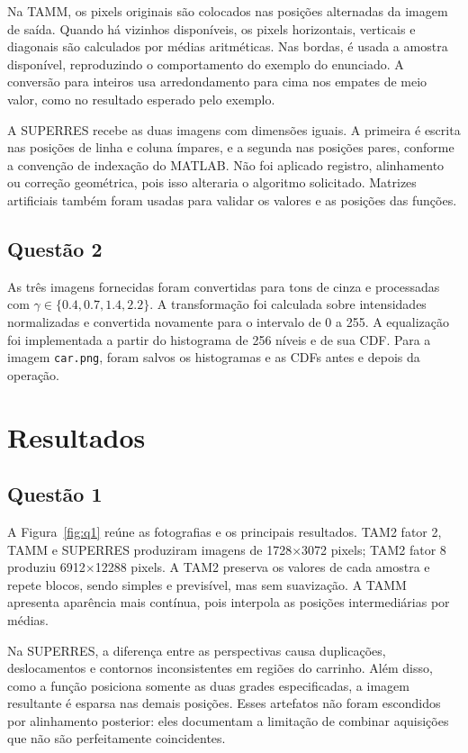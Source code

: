 \documentclass[conference]{IEEEtran}
\begin{document}
Na TAMM, os pixels originais são colocados nas posições alternadas da imagem de saída. Quando há vizinhos disponíveis, os pixels horizontais, verticais e diagonais são calculados por médias aritméticas. Nas bordas, é usada a amostra disponível, reproduzindo o comportamento do exemplo do enunciado. A conversão para inteiros usa arredondamento para cima nos empates de meio valor, como no resultado esperado pelo exemplo.

A SUPERRES recebe as duas imagens com dimensões iguais. A primeira é escrita nas posições de linha e coluna ímpares, e a segunda nas posições pares, conforme a convenção de indexação do MATLAB. Não foi aplicado registro, alinhamento ou correção geométrica, pois isso alteraria o algoritmo solicitado. Matrizes artificiais também foram usadas para validar os valores e as posições das funções.

\subsection{Questão 2}
As três imagens fornecidas foram convertidas para tons de cinza e processadas com $\gamma\in\{0.4,0.7,1.4,2.2\}$. A transformação foi calculada sobre intensidades normalizadas e convertida novamente para o intervalo de 0 a 255. A equalização foi implementada a partir do histograma de 256 níveis e de sua CDF. Para a imagem \texttt{car.png}, foram salvos os histogramas e as CDFs antes e depois da operação.

\section{Resultados}
\subsection{Questão 1}
A Figura~\ref{fig:q1} reúne as fotografias e os principais resultados. TAM2 fator 2, TAMM e SUPERRES produziram imagens de 1728$\times$3072 pixels; TAM2 fator 8 produziu 6912$\times$12288 pixels. A TAM2 preserva os valores de cada amostra e repete blocos, sendo simples e previsível, mas sem suavização. A TAMM apresenta aparência mais contínua, pois interpola as posições intermediárias por médias.

Na SUPERRES, a diferença entre as perspectivas causa duplicações, deslocamentos e contornos inconsistentes em regiões do carrinho. Além disso, como a função posiciona somente as duas grades especificadas, a imagem resultante é esparsa nas demais posições. Esses artefatos não foram escondidos por alinhamento posterior: eles documentam a limitação de combinar aquisições que não são perfeitamente coincidentes.
\end{document}
